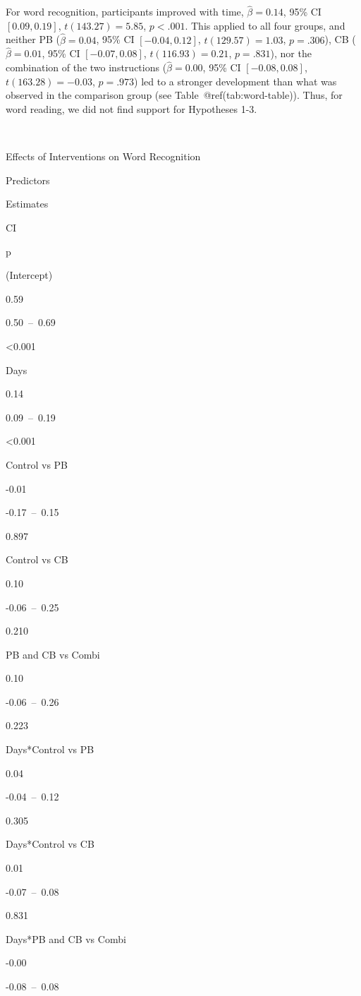 \documentclass[
]{article}
\begin{document}
For word recognition, participants improved with time,
\(\hat{\beta} = 0.14\), 95\% CI \([0.09, 0.19]\), \(t(143.27) = 5.85\),
\(p < .001\). This applied to all four groups, and neither PB
(\(\hat{\beta} = 0.04\), 95\% CI \([-0.04, 0.12]\),
\(t(129.57) = 1.03\), \(p = .306\)), CB (\(\hat{\beta} = 0.01\), 95\% CI
\([-0.07, 0.08]\), \(t(116.93) = 0.21\), \(p = .831\)), nor the
combination of the two instructions (\(\hat{\beta} = 0.00\), 95\% CI
\([-0.08, 0.08]\), \(t(163.28) = -0.03\), \(p = .973\)) led to a
stronger development than what was observed in the comparison group (see
Table~@ref(tab:word-table)). Thus, for word reading, we did not find
support for Hypotheses 1-3.

~

Effects of Interventions on Word Recognition

Predictors

Estimates

CI

p

(Intercept)

0.59

0.50~--~0.69

\textless0.001

Days

0.14

0.09~--~0.19

\textless0.001

Control vs PB

-0.01

-0.17~--~0.15

0.897

Control vs CB

0.10

-0.06~--~0.25

0.210

PB and CB vs Combi

0.10

-0.06~--~0.26

0.223

Days*Control vs PB

0.04

-0.04~--~0.12

0.305

Days*Control vs CB

0.01

-0.07~--~0.08

0.831

Days*PB and CB vs Combi

-0.00

-0.08~--~0.08
\end{document}
